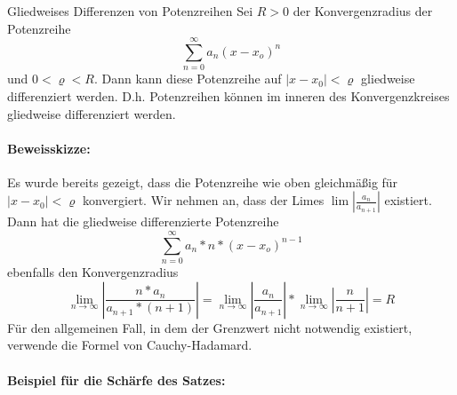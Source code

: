 \begin{satz}{Gliedweises Differenzen von Potenzreihen}
	Sei $R>0$ der Konvergenzradius der Potenzreihe
	\begin{equation*}
		\sum\limits_{n=0}^\infty a_n(x-x_o)^n
	\end{equation*}
	und $0<\varrho<R$. Dann kann diese Potenzreihe auf $|x-x_0|<\varrho$ gliedweise differenziert werden. D.h. Potenzreihen können im inneren des Konvergenzkreises gliedweise differenziert werden.
\end{satz}
\paragraph{Beweisskizze:}
Es wurde bereits gezeigt, dass die Potenzreihe wie oben gleichmäßig für $|x-x_0|<\varrho$ konvergiert.
Wir nehmen an, dass der Limes $\lim\left|\frac{a_n}{a_{n+1}}\right|$ existiert.
Dann hat die gliedweise differenzierte Potenzreihe
\begin{equation*}
	\sum\limits_{n=0}^\infty a_n*n*(x-x_o)^{n-1}
\end{equation*}
ebenfalls den Konvergenzradius
\begin{equation*}
	\lim\limits_{n\to\infty}\left|\frac{n*a_n}{a_{n+1}*(n+1)}\right|=\lim\limits_{n\to\infty}\left|\frac{a_n}{a_{n+1}}\right|*\lim\limits_{n\to\infty}\left|\frac{n}{n+1}\right|=R
\end{equation*}
Für den allgemeinen Fall, in dem der Grenzwert nicht notwendig existiert, verwende die Formel von Cauchy-Hadamard.

\paragraph{Beispiel für die Schärfe des Satzes:}

